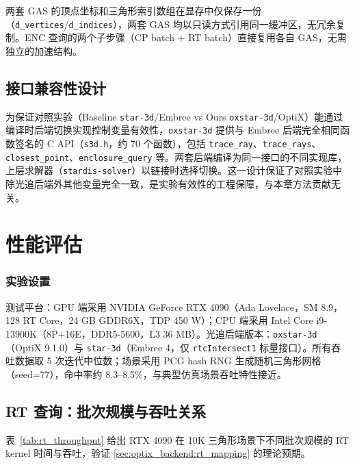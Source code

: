 两套 GAS 的顶点坐标和三角形索引数组在显存中仅保存一份（\texttt{d\_vertices}/\texttt{d\_indices}），两套 GAS 均以只读方式引用同一缓冲区，无冗余复制。ENC 查询的两个子步骤（CP batch + RT batch）直接复用各自 GAS，无需独立的加速结构。

\subsection{接口兼容性设计}

为保证对照实验（Baseline \texttt{star-3d}/Embree vs Ours \texttt{oxstar-3d}/OptiX）能通过编译时后端切换实现控制变量有效性，\texttt{oxstar-3d} 提供与 Embree 后端完全相同函数签名的 C API（\texttt{s3d.h}，约 70 个函数），包括 \texttt{trace\_ray}、\texttt{trace\_rays}、\texttt{closest\_point}、\texttt{enclosure\_query} 等。两套后端编译为同一接口的不同实现库，上层求解器（\texttt{stardis-solver}）以链接时选择切换。这一设计保证了对照实验中除光追后端外其他变量完全一致，是实验有效性的工程保障，与本章方法贡献无关。

\section{性能评估}
\label{sec:optix_backend:perf}

\subsubsection{实验设置}

测试平台：GPU 端采用 NVIDIA GeForce RTX 4090（Ada Lovelace，SM 8.9，128 RT Core，24 GB GDDR6X，TDP 450 W）；CPU 端采用 Intel Core i9-13900K（8P+16E，DDR5-5600，L3 36 MB）。光追后端版本：\texttt{oxstar-3d}（OptiX 9.1.0）与 \texttt{star-3d}（Embree 4，仅 \texttt{rtcIntersect1} 标量接口）。所有吞吐数据取 5 次迭代中位数；场景采用 PCG hash RNG 生成随机三角形网格（seed=77），命中率约 8.3--8.5\%，与典型仿真场景吞吐特性接近。

\subsection{RT 查询：批次规模与吞吐关系}

表~\ref{tab:rt_throughput} 给出 RTX 4090 在 10K 三角形场景下不同批次规模的 RT kernel 时间与吞吐，验证 \ref{sec:optix_backend:rt_mapping} 的理论预期。

